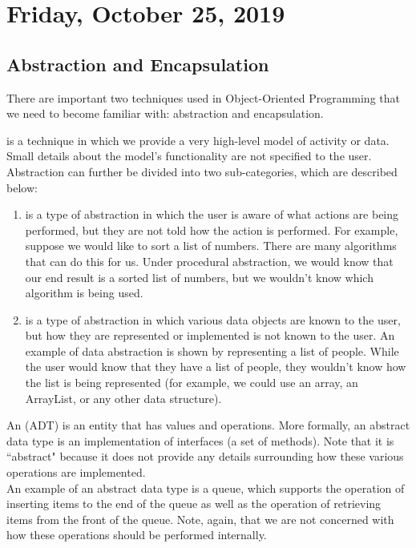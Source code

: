 \section{Friday, October 25, 2019}

\subsection{Abstraction and Encapsulation}
There are important two techniques used in Object-Oriented Programming that we need to become familiar with: abstraction and encapsulation. 

 is a technique in which we provide a very high-level model of activity or data. Small details about the model's functionality are not specified to the user.  Abstraction can further be divided into two sub-categories, which are described below:
\begin{enumerate}
    \item {} is a type of abstraction in which the user is aware of what actions are being performed, but they are not told how the action is performed. For example, suppose we would like to sort a list of numbers. There are many algorithms that can do this for us. Under procedural abstraction, we would know that our end result is a sorted list of numbers, but we wouldn't know which algorithm is being used.
    \item {} is a type of abstraction in which various data objects are known to the user, but how they are represented or implemented is not known to the user. An example of data abstraction is shown by representing a list of people. While the user would know that they have a list of people, they wouldn't know how the list is being represented (for example, we could use an array, an ArrayList, or any other data structure).
\end{enumerate}

An  (ADT) is an entity that has values and operations. More formally, an abstract data type is an implementation of interfaces (a set of methods). 
Note that it is ``abstract" because it does not provide any details surrounding how these various operations are implemented. \\

An example of an abstract data type is a queue, which supports the operation of inserting items to the end of the queue as well as the operation of retrieving items from the front of the queue. Note, again, that we are not concerned with how these operations should be performed internally. \\

